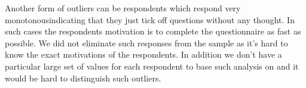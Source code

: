 Another form of outliers can be respondents which respond very
monotonous\dash{}indicating that they just tick off questions without any
thought. In such cases the respondents motivation is to complete the
questionnaire as fast as possible. We did not eliminate such responses from
the sample as it's hard to know the exact motivations of the respondents.
In addition we don't have a particular large set of values for each respondent
to base such analysis on and it would be hard to distinguish such outliers.
